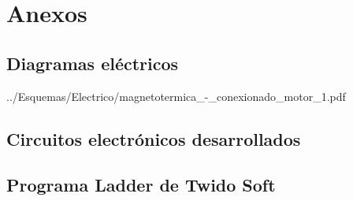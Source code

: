 \chapter{Anexos}
\label{ch:anexos}



\cleardoublepage
\section{Diagramas eléctricos}
\label{anexo:diag}

{../Esquemas/Electrico/magnetotermica_-_conexionado_motor_1.pdf}





\cleardoublepage
\section{Circuitos electrónicos desarrollados}
\label{anexo:circuitos}




\cleardoublepage
\section{Programa Ladder de Twido Soft}
\label{anexo:programaLadder}

